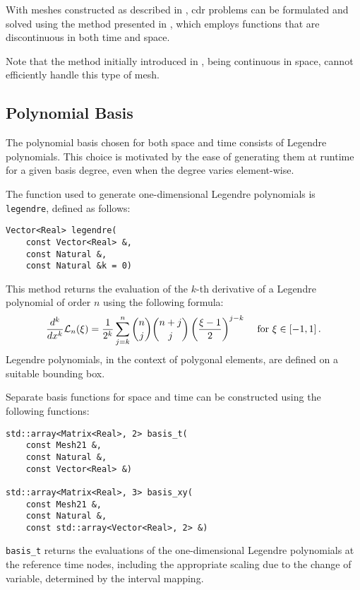With meshes constructed as described in , \acrshort{cdr} problems can be formulated and solved using the method presented in , which employs functions that are discontinuous in both time and space.

Note that the method initially introduced in , being continuous in space, cannot efficiently handle this type of mesh.

\subsection{Polynomial Basis}

The polynomial basis chosen for both space and time consists of Legendre polynomials. This choice is motivated by the ease of generating them at runtime for a given basis degree, even when the degree varies element-wise.

The function used to generate one-dimensional Legendre polynomials is \lstinline{legendre}, defined as follows:
\begin{lstlisting}[style=cpp]
Vector<Real> legendre(
    const Vector<Real> &, 
    const Natural &, 
    const Natural &k = 0)
\end{lstlisting}

This method returns the evaluation of the $k$-th derivative of a Legendre polynomial of order $n$ using the following formula:
\begin{align}
    \frac{d^k}{dx^k} \mathcal{L}_n(\xi) &= \frac{1}{2^k} \sum_{j = k}^{n} \binom{n}{j} \binom{n + j}{j} \left( \frac{\xi - 1}{2} \right)^{j - k} &\text{ for } \xi \in \left[ -1, 1 \right].
\end{align}
Legendre polynomials, in the context of polygonal elements, are defined on a suitable bounding box.

Separate basis functions for space and time can be constructed using the following functions:
\begin{lstlisting}[style=cpp]
std::array<Matrix<Real>, 2> basis_t(
    const Mesh21 &, 
    const Natural &, 
    const Vector<Real> &)

std::array<Matrix<Real>, 3> basis_xy(
    const Mesh21 &, 
    const Natural &, 
    const std::array<Vector<Real>, 2> &)
\end{lstlisting}

\lstinline{basis_t} returns the evaluations of the one-dimensional Legendre polynomials at the reference time nodes, including the appropriate scaling due to the change of variable, determined by the interval mapping.

